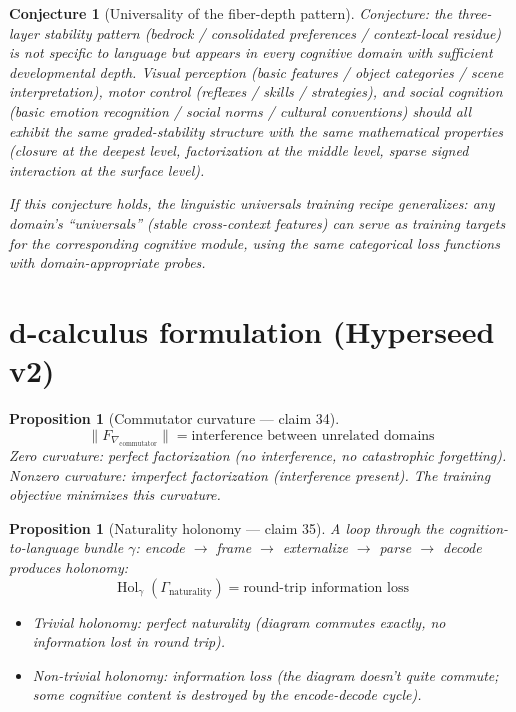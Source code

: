 \documentclass[11pt,a4paper]{article}
\newtheorem{proposition}[definition]{Proposition}
\newtheorem{conjecture}[definition]{Conjecture}
\begin{document}
\begin{conjecture}[Universality of the fiber-depth pattern]
Conjecture: the three-layer stability pattern (bedrock / consolidated
preferences / context-local residue) is not specific to language but
appears in every cognitive domain with sufficient developmental depth.
Visual perception (basic features / object categories / scene
interpretation), motor control (reflexes / skills / strategies),
and social cognition (basic emotion recognition / social norms /
cultural conventions) should all exhibit the same graded-stability
structure with the same mathematical properties (closure at the
deepest level, factorization at the middle level, sparse signed
interaction at the surface level).

If this conjecture holds, the linguistic universals training recipe
generalizes: any domain's ``universals'' (stable cross-context
features) can serve as training targets for the corresponding
cognitive module, using the same categorical loss functions with
domain-appropriate probes.
\end{conjecture}

\section{d-calculus formulation (Hyperseed v2)}

\begin{proposition}[Commutator curvature --- claim 34]
\label{prop:commutator_curv}
\[
  \|F_{\nabla_{\text{commutator}}}\| = \text{interference between
    unrelated domains}
\]
Zero curvature: perfect factorization (no interference, no catastrophic
forgetting). Nonzero curvature: imperfect factorization (interference
present). The training objective minimizes this curvature.
\end{proposition}

\begin{proposition}[Naturality holonomy --- claim 35]
\label{prop:naturality_hol}
A loop through the cognition-to-language bundle $\gamma$:
encode $\to$ frame $\to$ externalize $\to$ parse $\to$ decode produces
holonomy:
\[
  \operatorname{Hol}_\gamma(\Gamma_{\text{naturality}}) =
    \text{round-trip information loss}
\]
\begin{itemize}
  \item Trivial holonomy: perfect naturality (diagram commutes exactly,
    no information lost in round trip).
  \item Non-trivial holonomy: information loss (the diagram doesn't
    quite commute; some cognitive content is destroyed by the
    encode-decode cycle).
\end{itemize}
\end{proposition}
\end{document}
